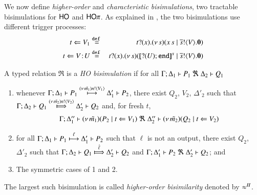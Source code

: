 \smallskip 

 We now define 
\emph{higher-order} 
and
\emph{characteristic
bisimulations}, 
two tractable bisimulations for $\mathsf{HO}$ and $\mathsf{HO}\pi$.
As explained in ,
the two bisimulations use different trigger processes:
\begin{eqnarray*}
\htrigger{t}{V_1}  & \defeq &  \hotrigger{t}{V} \label{eqb:0} \\
	\ftrigger{t}{V}{U} & \defeq &  \fotrigger{t}{x}{s}{\btinp{U} \tinact}{V} 	\label{eqb:4}
\end{eqnarray*}

\smallskip 

\begin{definition}\rm
	\label{d:hbw}
A typed relation $\Re$ is a {\em  HO bisimulation} if 
for all $\horel{\Gamma}{\Delta_1}{P_1}{\ \Re \ }{\Delta_2}{Q_1}$ 
\begin{enumerate}[1)]
\item 
whenever 
$\Gamma; \Delta_1 \vdash P_1 \stackrel{(\nu\, \tilde{m_1}) n ! \langle V_1 \rangle}{\longmapsto} \Delta_1' \vdash P_2$, there exist 
$Q_2$, $V_2$, $\Delta'_2$ such that 
$\horel{\Gamma}{\Delta_2}{Q_1}{\Hby{\news{\tilde{m_2}} \bactout{n}{V_2}}}{\Delta_2'}{Q_2}$ and, for fresh $t$, 
\[
\begin{array}{lrlll}
\Gamma; \Delta''_1  \vdash  {(\nu\, \tilde{m_1})(P_2 \;|\;t \Leftarrow V_1)}
\ \Re 
\ \Delta''_2 \vdash {(\nu\, \tilde{m_2})(Q_2 \;|\;t \Leftarrow V_2)}
\end{array}
\]
		\item	
for all $\Gamma; \Delta_1 \vdash P_1 \stackrel{\ell}{\longmapsto} \Delta_1' \vdash P_2$ such that 
$\ell$ is not an output, 
 there exist $Q_2$, $\Delta'_2$ such that 
$\horel{\Gamma}{\Delta_2}{Q_1}{\Hby{\hat{\ell}}}{\Delta_2'}{Q_2}$
			and
			$\horel{\Gamma}{\Delta_1'}{P_2}{\ \Re \ }{\Delta_2'}{Q_2}$; and 

                      \item	The symmetric cases of 1 and 2.                
	\end{enumerate}
	The largest such bisimulation
	is called \emph{higher-order bisimilarity}  denoted by $\approx^H$.
\end{definition}

